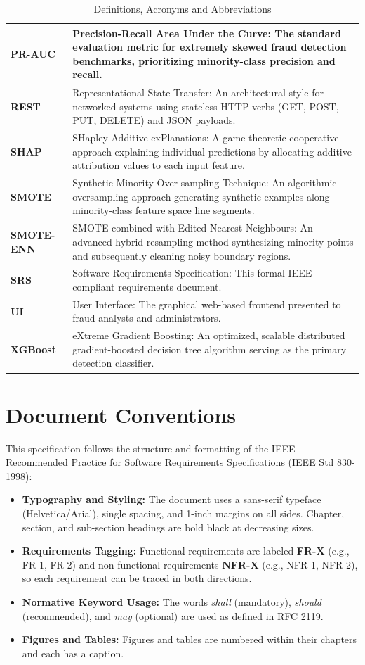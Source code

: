 \documentclass[12pt, a4paper]{report}
\begin{document}
\begin{table}[h]
\begin{tabularx}{\textwidth}{|l|X|}
\hline
\textbf{PR-AUC} & Precision-Recall Area Under the Curve: The standard evaluation metric for extremely skewed fraud detection benchmarks, prioritizing minority-class precision and recall. \\
\hline
\textbf{REST} & Representational State Transfer: An architectural style for networked systems using stateless HTTP verbs (GET, POST, PUT, DELETE) and JSON payloads. \\
\hline
\textbf{SHAP} & SHapley Additive exPlanations: A game-theoretic cooperative approach explaining individual predictions by allocating additive attribution values to each input feature. \\
\hline
\textbf{SMOTE} & Synthetic Minority Over-sampling Technique: An algorithmic oversampling approach generating synthetic examples along minority-class feature space line segments. \\
\hline
\textbf{SMOTE-ENN} & SMOTE combined with Edited Nearest Neighbours: An advanced hybrid resampling method synthesizing minority points and subsequently cleaning noisy boundary regions. \\
\hline
\textbf{SRS} & Software Requirements Specification: This formal IEEE-compliant requirements document. \\
\hline
\textbf{UI} & User Interface: The graphical web-based frontend presented to fraud analysts and administrators. \\
\hline
\textbf{XGBoost} & eXtreme Gradient Boosting: An optimized, scalable distributed gradient-boosted decision tree algorithm serving as the primary detection classifier. \\
\hline
\end{tabularx}
\caption{Definitions, Acronyms and Abbreviations}
\end{table}

\section{Document Conventions}
This specification follows the structure and formatting of the IEEE Recommended Practice for Software Requirements Specifications (IEEE Std 830-1998):
\begin{itemize}
    \item \textbf{Typography and Styling:} The document uses a sans-serif typeface (Helvetica/Arial), single spacing, and 1-inch margins on all sides. Chapter, section, and sub-section headings are bold black at decreasing sizes.
    \item \textbf{Requirements Tagging:} Functional requirements are labeled \textbf{FR-X} (e.g., FR-1, FR-2) and non-functional requirements \textbf{NFR-X} (e.g., NFR-1, NFR-2), so each requirement can be traced in both directions.
    \item \textbf{Normative Keyword Usage:} The words \textit{shall} (mandatory), \textit{should} (recommended), and \textit{may} (optional) are used as defined in RFC 2119.
    \item \textbf{Figures and Tables:} Figures and tables are numbered within their chapters and each has a caption.
\end{itemize}
\end{document}
